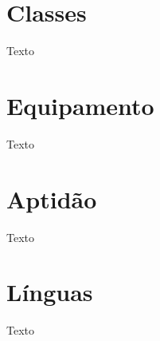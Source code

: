 \documentclass[a5paper, 10pt]{book}
\begin{document}
\section{Classes}

Texto

\section{Equipamento}

Texto

\section{Aptidão}

Texto

\section{Línguas}

Texto
\end{document}
